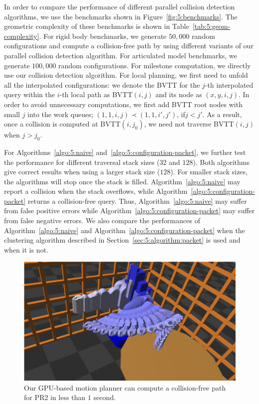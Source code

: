 In order to compare the performance of different parallel collision detection algorithms, we use the benchmarks shown
in Figure~\ref{fig:5:benchmarks}. The geometric complexity of these benchmarks is shown in  Table~\ref{tab:5:geom-complexity}.
For rigid body benchmarks, we generate $50,000$ random configurations and compute a collision-free path by using different
variants of our parallel collision detection algorithm. For articulated model benchmarks, we generate $100,000$
random configurations. For milestone computation, we directly use our collision
detection algorithm. For local planning, we first need to unfold all the interpolated configurations: we denote the
BVTT for the $j$-th interpolated query within the $i$-th local path as BVTT$(i,j)$ and its node as $(x,y,i,j)$.
In order to avoid unnecessary computations, we first add BVTT root nodes with small $j$ into the work queues; $(1,1,i,j) \prec (1,1,i',j')$, if$j < j'$. As a result, once a collision is computed at BVTT$(i, j_0)$,
we need not traverse BVTT$(i, j)$ when $j > j_0$.

For Algorithms~\ref{algo:5:naive} and~\ref{algo:5:configuration-packet}, we further test the performance for
different traversal stack sizes ($32$ and $128$). Both algorithms give correct results when using a larger stack size ($128$). For smaller stack sizes, the algorithms will stop once the stack is filled.
Algorithm~\ref{algo:5:naive} may report a collision when the stack overflows, while Algorithm~\ref{algo:5:configuration-packet}
returns a collision-free query. Thus, Algorithm~\ref{algo:5:naive} may suffer from false positive errors while Algorithm~\ref{algo:5:configuration-packet}
may suffer from false negative errors. We also
compare the performances of Algorithm~\ref{algo:5:naive} and Algorithm~\ref{algo:5:configuration-packet} when the clustering algorithm described in Section~\ref{sec:5:algorithm:packet} is used and when it is not.

\begin{figure}[htb]
  \centering
  \includegraphics[width=\linewidth]{figs/5/pr2_result.png}
  \caption[The GPU-based motion planner can compute a collision-free path for PR2 in less than $1$ second]{Our GPU-based motion planner can compute a collision-free path for PR2 in less than $1$ second. }
  \label{fig:5:PR2result}
\end{figure}


